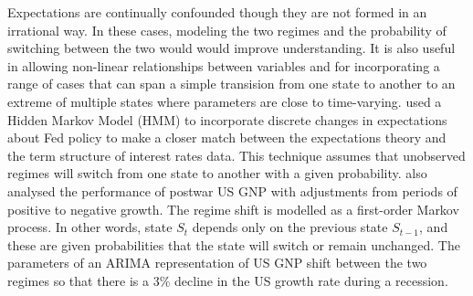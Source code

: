 \documentclass[12pt, a4paper, oneside]{article} %
\begin{document}
Expectations are continually confounded though they are not formed in an irrational way. In these cases, modeling the two regimes and the probability of switching between the two would would improve understanding.  It is also useful in allowing non-linear relationships between variables and for incorporating a range of cases that can span a simple transision from one state to another to an extreme of multiple states where parameters are close to time-varying.  \citet{hamilton1988rational} used a Hidden Markov Model (HMM) to incorporate discrete changes in expectations about Fed policy to make a closer match between the expectations theory and the term structure of interest rates data.  This technique assumes that unobserved regimes will switch from one state to another with a given probability.  \citet{Hamilton1989} also analysed the performance of postwar US GNP with adjustments from periods of positive to negative growth. The regime shift is modelled as a first-order Markov process.  In other words, state $S_t$ depends only on the previous state $S_{t-1}$, and these are given probabilities that the state will switch or remain unchanged.  The parameters of an ARIMA representation of US GNP shift between the two regimes so that there is a 3\% decline in the US growth rate during a recession.  




\end{document}
